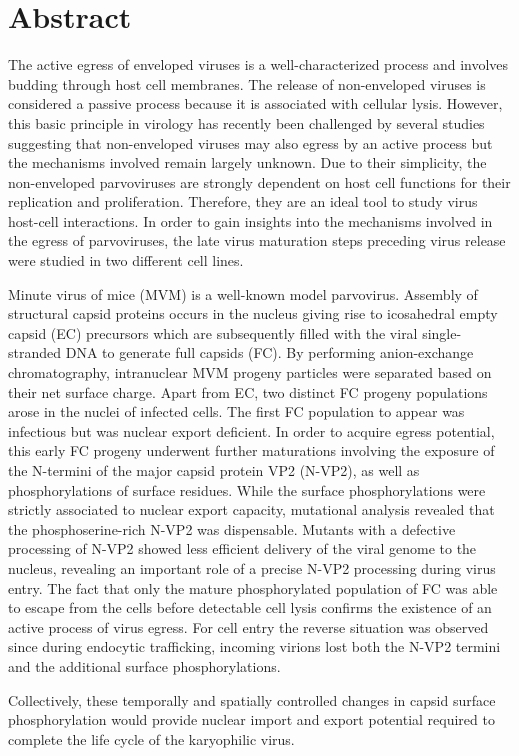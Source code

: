 

\chapter*{Abstract}


\label{Abstract} %


The active egress of enveloped viruses is a well-characterized process and involves budding through host cell membranes. The release of non-enveloped viruses is considered a passive process because it is associated with cellular lysis. However, this basic principle in virology has recently been challenged by several studies suggesting that non-enveloped viruses may also egress by an active process but the mechanisms involved remain largely unknown. Due to their simplicity, the non-enveloped parvoviruses are strongly dependent on host cell functions for their replication and proliferation. Therefore, they are an ideal tool to study virus host-cell interactions. In order to gain insights into the mechanisms involved in the egress of parvoviruses, the late virus maturation steps preceding virus release were studied in two different cell lines. 
	
\par
\medskip
Minute virus of mice (MVM) is a well-known model parvovirus. Assembly of structural capsid proteins occurs in the nucleus giving rise to icosahedral empty capsid (EC) precursors which are subsequently filled with the viral single-stranded DNA to generate full capsids (FC). By performing anion-exchange chromatography, intranuclear MVM progeny particles were separated based on their net surface charge. Apart from EC, two distinct FC progeny populations arose in the nuclei of infected cells. The first FC population to appear was infectious but was nuclear export deficient. In order to acquire egress potential, this early FC progeny underwent further maturations involving the exposure of the N-termini of the major capsid protein VP2 (N-VP2), as well as phosphorylations of surface residues. While the surface phosphorylations were strictly associated to nuclear export capacity, mutational analysis revealed that the phosphoserine-rich N-VP2 was dispensable. Mutants with a defective processing of N-VP2 showed less efficient delivery of the viral genome to the nucleus, revealing an important role of a precise N-VP2 processing during virus entry. The fact that only the mature phosphorylated population of FC was able to escape from the cells before detectable cell lysis confirms the existence of an active process of virus egress. For cell entry the reverse situation was observed since during endocytic trafficking, incoming virions lost both the N-VP2 termini and the additional surface phosphorylations. 
	
\par
\medskip
Collectively, these temporally and spatially controlled changes in capsid surface phosphorylation would provide nuclear import and export potential required to complete the life cycle of the karyophilic virus. 